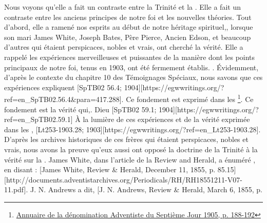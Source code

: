 Nous voyons qu'elle a fait un contraste entre la Trinité et la . Elle a fait un contraste entre les anciens principes de notre foi et les nouvelles théories. Tout d'abord, elle a ramené nos esprits au début de notre héritage spirituel,, lorsque son mari James White, Joseph Bates, Père Pierce, Ancien Edson, et beaucoup d'autres qui étaient perspicaces, nobles et vrais, ont cherché la vérité. Elle a rappelé les expériences merveilleuses et puissantes de la manière dont les points principaux de notre foi, tenus en 1903, ont été fermement établis.   . Évidemment, d'après le contexte du chapitre 10 des Témoignages Spéciaux, nous savons que ces expériences expliquent [SpTB02 56.4; 1904][https://egwwritings.org/?ref=en\_SpTB02.56.4\&para=417.288]. Ce fondement est exprimé dans les \footnote{\href{https://static1.squarespace.com/static/554c4998e4b04e89ea0c4073/t/59d17e24c027d84167e17617/1506901547915/SDA-YB1905+\%28P.+188-192\%29.pdf}{Annuaire de la dénomination Adventiste du Septième Jour 1905, p. 188-192}}. Ce fondement est la vérité qui,. Dieu [SpTB02 59.1; 1904][https://egwwritings.org/?ref=en\_SpTB02.59.1] À la lumière de ces expériences et de la vérité exprimée dans les , [Lt253-1903.28; 1903][https://egwwritings.org/?ref=en\_Lt253-1903.28]. D'après les archives historiques de ces frères qui étaient perspicaces, nobles et vrais, nous avons la preuve qu'eux aussi ont opposé la doctrine de la Trinité à la vérité sur la . James White, dans l'article de la Review and Herald, a énuméré , en disant : [James White, Review \& Herald, December 11, 1855, p. 85.15][http://documents.adventistarchives.org/Periodicals/RH/RH18551211-V07-11.pdf]. J. N. Andrews a dit, [J. N. Andrews, Review \& Herald, March 6, 1855, p. 
